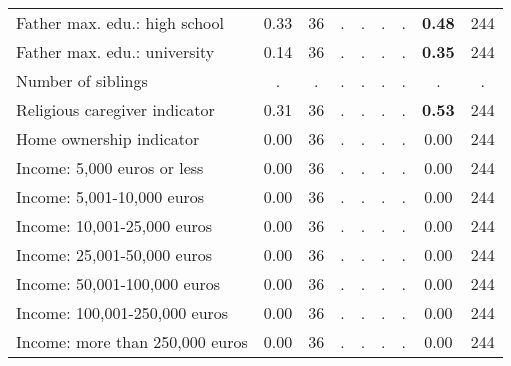 \begin{tabular}{l c c c c c c c c}
Father max. edu.: high school &      0.33 &        36 &         . & . &         . & . & \textbf{     0.48} &       244 \\
Father max. edu.: university &      0.14 &        36 &         . & . &         . & . & \textbf{     0.35} &       244 \\
Number of siblings &         . & . &         . & . &         . & . &         . & . \\
Religious caregiver indicator &      0.31 &        36 &         . & . &         . & . & \textbf{     0.53} &       244 \\
Home ownership indicator &      0.00 &        36 &         . & . &         . & . &      0.00 &       244 \\
Income: 5,000 euros or less &      0.00 &        36 &         . & . &         . & . &      0.00 &       244 \\
Income: 5,001-10,000 euros &      0.00 &        36 &         . & . &         . & . &      0.00 &       244 \\
Income: 10,001-25,000 euros &      0.00 &        36 &         . & . &         . & . &      0.00 &       244 \\
Income: 25,001-50,000 euros &      0.00 &        36 &         . & . &         . & . &      0.00 &       244 \\
Income: 50,001-100,000 euros &      0.00 &        36 &         . & . &         . & . &      0.00 &       244 \\
Income: 100,001-250,000 euros &      0.00 &        36 &         . & . &         . & . &      0.00 &       244 \\
Income: more than 250,000 euros &      0.00 &        36 &         . & . &         . & . &      0.00 &       244 \\
\bottomrule
\end{tabular}
